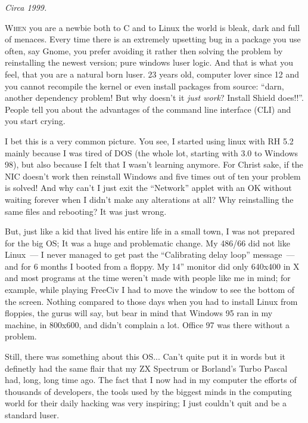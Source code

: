 \documentclass{memoir}
\begin{document}
\begin{flushright}
  \emph{Circa 1999.}
\end{flushright}

\lettrine{W}{hen} you are a newbie both to C and to Linux the world is
bleak, dark and full of menaces. Every time there is an extremely
upsetting bug in a package you use often, say Gnome, you prefer
avoiding it rather then solving the problem by reinstalling the newest
version; pure windows luser logic. And that is what you feel, that you
are a natural born luser. 23 years old, computer lover since 12 and
you cannot recompile the kernel or even install packages from source:
``darn, another dependency problem!  But why doesn't it \emph{just
  work}?  Install Shield does!!''. People tell you about the
advantages of the command line interface (CLI) and you start crying.

I bet this is a very common picture. You see, I started using linux
with RH 5.2 mainly because I was tired of DOS (the whole lot, starting
with 3.0 to Windows 98), but also because I felt that I wasn't
learning anymore. For Christ sake, if the NIC doesn't work then
reinstall Windows and five times out of ten your problem is solved!
And why can't I just exit the ``Network'' applet with an OK without
waiting forever when I didn't make any alterations at all? Why
reinstalling the same files and rebooting?  It was just wrong.

But, just like a kid that lived his entire life in a small town, I was
not prepared for the big OS; It was a huge and problematic change. My
486/66 did not like Linux~--- I never managed to get past the
``Calibrating delay loop'' message~--- and for 6 months I booted from
a floppy. My 14'' monitor did only 640x400 in X and most programs at
the time weren't made with people like me in mind; for example, while
playing FreeCiv I had to move the window to see the bottom of the
screen. Nothing compared to those days when you had to install Linux
from floppies, the gurus will say, but bear in mind that Windows 95
ran in my machine, in 800x600, and didn't complain a lot. Office 97
was there without a problem.

Still, there was something about this OS... Can't quite put it in
words but it definetly had the same flair that my ZX Spectrum or
Borland's Turbo Pascal had, long, long time ago. The fact that I now
had in my computer the efforts of thousands of developers, the tools
used by the biggest minds in the computing world for their daily
hacking was very inspiring; I just couldn't quit and be a standard
luser.
\end{document}
